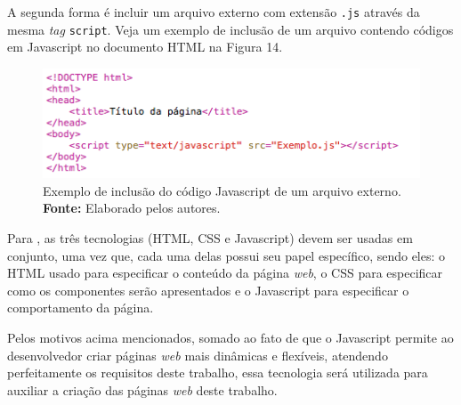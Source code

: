 A segunda forma é incluir um arquivo externo com extensão \texttt{.js} através da mesma \textit{tag} \texttt{script}. Veja um exemplo de inclusão de um arquivo contendo códigos em Javascript no documento HTML na Figura 14.

\begin{figure}[h!]
	\centerline{\includegraphics[scale=0.8]{./imagens/javascript_include.png}}
	\caption[Exemplo de inclusão do código Javascript de um arquivo externo]
	{Exemplo de inclusão do código Javascript de um arquivo externo. \textbf{Fonte:} Elaborado pelos autores.}
	\label{fig:exemplo1}
\end{figure}

Para , as três tecnologias (HTML, CSS e Javascript) devem ser usadas em conjunto, uma vez que, cada uma delas possui seu papel específico, sendo eles: o HTML usado para especificar o conteúdo da página \textit{web}, o CSS para especificar como os componentes serão apresentados e o Javascript para especificar o comportamento da página.

Pelos motivos acima mencionados, somado ao fato de que o Javascript permite ao desenvolvedor criar páginas \textit{web} mais dinâmicas e flexíveis, atendendo perfeitamente os requisitos deste trabalho, essa tecnologia será utilizada para auxiliar a criação das páginas \textit{web} deste trabalho.